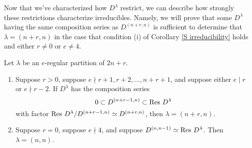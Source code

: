 \documentclass{amsart}
\begin{document}
  Now that we've characterized how $D^\lambda$ restrict, we can describe how strongly these restrictions characterize irreducibles.
  Namely, we will prove that some $D^\lambda$ having the same composition series as  $D^{(n+r,n)}$ is sufficient to determine that $\lambda = (n+r,n)$ in the case that condition (i) of Corollary \ref{S irreducibility} holds and either $r \neq 0$ or $e \neq 4$.
  \begin{proposition}\label{Combinatorics}
    Let $\lambda$ be an $e$-regular partition of $2n + r$.
    \begin{enumerate}[label={(\roman*)}]
      \item Suppose $r > 0$, suppose $e \nmid r+1, r + 2,\dots,n + r + 1$, and suppose either $e \mid r$ or $e \nmid r-2$.
        If $D^\lambda$ has the composition series 
        \begin{equation}\label{D Composition Series}
          0 \subset D^{(n+r-1,n)} \subset \operatorname{Res} \, D^{\lambda}
        \end{equation}
        with factor $\operatorname{Res} \, D^{\lambda} / D^{(n+r-1,n)} \simeq D^{(n+r,n)}$, then $\lambda = (n+r,n)$.
      \item Suppose $r = 0$, suppose $e \nmid 4$, and suppose $D^{(n,n-1)} \simeq \operatorname{Res} \, D^\lambda$.
        Then $\lambda = (n,n)$. 
    \end{enumerate}
  \end{proposition}
\end{document}

